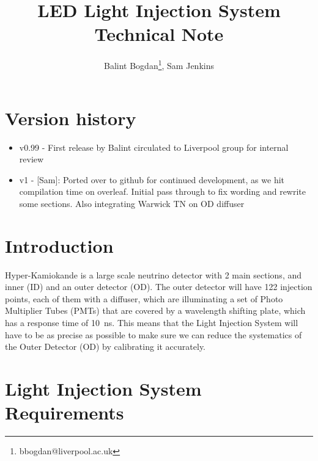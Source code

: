 \documentclass[a4paper,11pt]{article}
\begin{document}
\title{\boldmath LED Light Injection System Technical Note}
\author{Balint Bogdan\footnote{bbogdan@liverpool.ac.uk}, Sam Jenkins}

\maketitle

\tableofcontents

\newpage

\section{Version history}
\begin{itemize}
\item v0.99 - First release by Balint circulated to Liverpool group for internal review
\item v1 - [Sam]: Ported over to github for continued development, as we hit compilation time on overleaf. Initial pass through to fix wording and rewrite some sections. Also integrating Warwick TN on OD diffuser
\end{itemize}

\newpage

\section{Introduction}
\label{sec:intro}

Hyper-Kamiokande is a large scale neutrino detector with 2 main sections, and inner (ID) and an outer detector (OD). The outer detector will have 122 injection points, each of them with a diffuser, which are illuminating a set of Photo Multiplier Tubes (PMTs) that are covered by a wavelength shifting plate, which has a response time of 10~ns. This means that the Light Injection System will have to be as precise as possible to make sure we can reduce the systematics of the Outer Detector (OD) by calibrating it accurately.

\section{Light Injection System Requirements}
\end{document}
